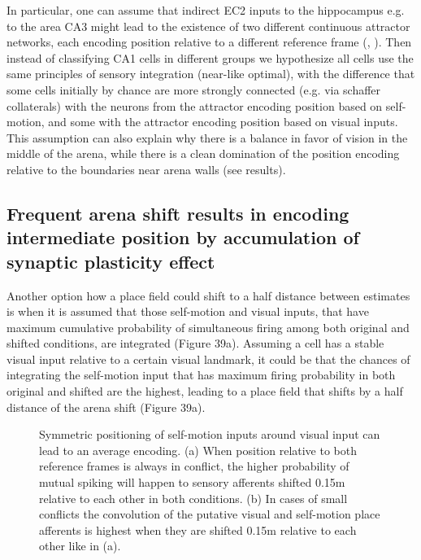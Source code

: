 In particular, one can assume that indirect EC2 inputs to the hippocampus e.g. to the area CA3 might lead to the existence of two different continuous attractor networks, each encoding position relative to a different reference frame (\cite{Li2020}, \cite{Haas2019}). Then instead of classifying CA1 cells in different groups we hypothesize all cells use the same principles of sensory integration (near-like optimal), with the difference that some cells initially by chance are more strongly connected (e.g. via schaffer collaterals) with the neurons from the attractor encoding position based on self-motion, and some with the attractor encoding position based on visual inputs. This assumption can also explain why there is a balance in favor of vision in the middle of the arena, while there is a clean domination of the position encoding relative to the boundaries near arena walls (see results).


\subsection{Frequent arena shift results in encoding intermediate position by accumulation of synaptic plasticity effect}

Another option how a place field could shift to a half distance between estimates is when it is assumed that those self-motion and visual inputs, that have maximum cumulative probability of simultaneous firing among both original and shifted conditions, are integrated (Figure 39a). Assuming a cell has a stable visual input relative to a certain visual landmark, it could be that the chances of integrating the self-motion input that has maximum firing probability in both original and shifted are the highest, leading to a place field that shifts by a half distance of the arena shift (Figure 39a).

\begin{figure}
\captionsetup{format=plain}
\caption[Symmetric encoding]{
Symmetric positioning of self-motion inputs around visual input can lead to an average encoding. (a) When position relative to both reference frames is always in conflict, the higher probability of mutual spiking will happen to sensory afferents shifted 0.15m relative to each other in both conditions. (b) In cases of small conflicts the convolution of the putative visual and self-motion place afferents is highest when they are shifted 0.15m relative to each other like in (a).
}
\label{fig:F39_symmetric_encoding}
\end{figure}

